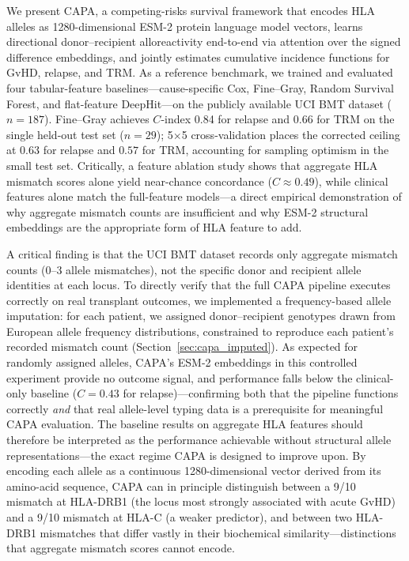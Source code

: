 \documentclass[11pt,a4paper]{article}
\begin{document}
We present CAPA, a competing-risks survival framework that encodes HLA alleles
as 1280-dimensional ESM-2 protein language model vectors, learns directional
donor--recipient alloreactivity end-to-end via attention over the signed
difference embeddings, and jointly estimates
cumulative incidence functions for GvHD, relapse, and TRM.  As a reference
benchmark, we trained and evaluated four tabular-feature baselines---cause-specific
Cox, Fine--Gray, Random Survival Forest, and flat-feature DeepHit---on the
publicly available UCI BMT dataset ($n=187$).  Fine--Gray achieves $C$-index
0.84 for relapse and 0.66 for TRM on the single held-out test set ($n=29$);
5$\times$5 cross-validation places the corrected ceiling at $0.63$ for relapse
and $0.57$ for TRM, accounting for sampling optimism in the small test set.
Critically, a feature ablation study shows that aggregate HLA mismatch scores
alone yield near-chance concordance ($C \approx 0.49$), while clinical features
alone match the full-feature models---a direct empirical demonstration of why
aggregate mismatch counts are insufficient and why ESM-2 structural embeddings
are the appropriate form of HLA feature to add.

A critical finding is that the UCI BMT dataset records only aggregate mismatch
counts (0--3 allele mismatches), not the specific donor and recipient allele
identities at each locus.  To directly verify that the full CAPA pipeline
executes correctly on real transplant outcomes, we implemented a frequency-based
allele imputation: for each patient, we assigned donor--recipient genotypes
drawn from European allele frequency distributions, constrained to reproduce
each patient's recorded mismatch count (Section~\ref{sec:capa_imputed}).  As
expected for randomly assigned alleles, CAPA's ESM-2 embeddings in this
controlled experiment provide no outcome signal, and performance falls below the
clinical-only baseline ($C = 0.43$ for relapse)---confirming both that the
pipeline functions correctly \emph{and} that real allele-level typing data is a
prerequisite for meaningful CAPA evaluation.  The baseline results on aggregate
HLA features should therefore be interpreted
as the performance achievable without structural allele representations---the
exact regime CAPA is designed to improve upon.  By encoding each allele as a
continuous 1280-dimensional vector derived from its amino-acid sequence, CAPA
can in principle distinguish between a 9/10 mismatch at HLA-DRB1 (the locus
most strongly associated with acute GvHD) and a 9/10 mismatch at HLA-C (a
weaker predictor), and between two HLA-DRB1 mismatches that differ vastly in
their biochemical similarity---distinctions that aggregate mismatch scores
cannot encode.
\end{document}
